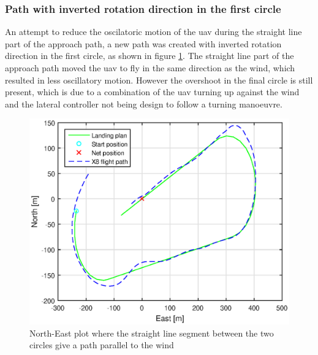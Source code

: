 \subsubsection{Path with inverted rotation direction in the first circle}
An attempt to reduce the oscilatoric motion of the \gls{uav} during the straight line part of the approach path, a new path was created with inverted rotation direction in the first circle, as shown in figure \ref{Fig:NorthEast31mai125420}. The straight line part of the approach path moved the \gls{uav} to fly in the same direction as the wind, which resulted in less oscillatory motion. However the overshoot in the final circle is still present, which is due to a combination of the \gls{uav} turning up against the wind and the lateral controller not being design to follow a turning manoeuvre.
\begin{figure}[H]
	\centering
	\includegraphics[scale=0.7]{figs/Experiment/NorthEast31mai125420.eps}
	\caption{North-East plot where the straight line segment between the two circles give a path parallel to the wind}
	\label{Fig:NorthEast31mai125420}
\end{figure}
